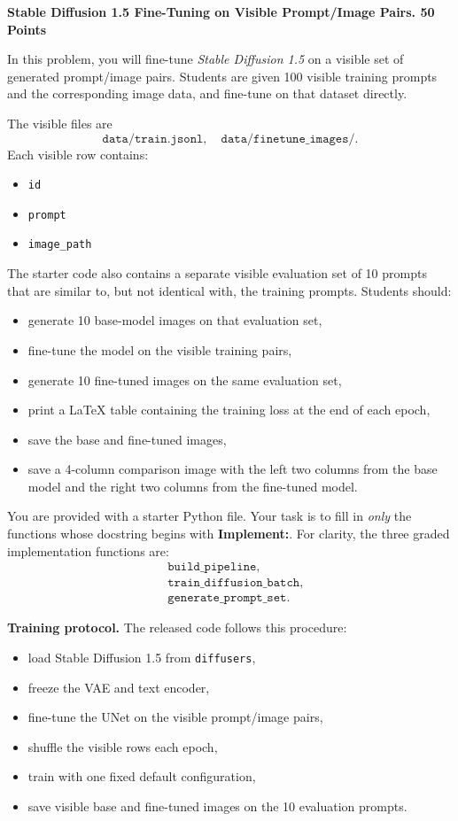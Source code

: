 \begin{Q}
\textbf{Stable Diffusion 1.5 Fine-Tuning on Visible Prompt/Image Pairs. 50 Points}

In this problem, you will fine-tune \emph{Stable Diffusion 1.5} on a visible
set of generated prompt/image pairs.
Students are given 100 visible training prompts and the corresponding image
data, and fine-tune on that dataset directly.

The visible files are
\[
\texttt{data/train.jsonl},\quad
\texttt{data/finetune\_images/}.
\]
Each visible row contains:
\begin{itemize}
\item \texttt{id}
\item \texttt{prompt}
\item \texttt{image\_path}
\end{itemize}

The starter code also contains a separate visible evaluation set of
10 prompts that are similar to, but not identical with, the training prompts.
Students should:
\begin{itemize}
\item generate 10 base-model images on that evaluation set,
\item fine-tune the model on the visible training pairs,
\item generate 10 fine-tuned images on the same evaluation set,
\item print a LaTeX table containing the training loss at the end of each epoch,
\item save the base and fine-tuned images,
\item save a 4-column comparison image with the left two columns from the base
model and the right two columns from the fine-tuned model.
\end{itemize}

You are provided with a starter Python file.
Your task is to fill in \emph{only} the functions whose docstring begins with
\textbf{Implement:}.
For clarity, the three graded implementation functions are:
\begin{align*}
&\texttt{build\_pipeline},\\
&\texttt{train\_diffusion\_batch},\\
&\texttt{generate\_prompt\_set}.
\end{align*}

\medskip
\noindent\textbf{Training protocol.}
The released code follows this procedure:
\begin{itemize}
\item load Stable Diffusion 1.5 from \texttt{diffusers},
\item freeze the VAE and text encoder,
\item fine-tune the UNet on the visible prompt/image pairs,
\item shuffle the visible rows each epoch,
\item train with one fixed default configuration,
\item save visible base and fine-tuned images on the 10 evaluation prompts.
\end{itemize}


\end{Q}
